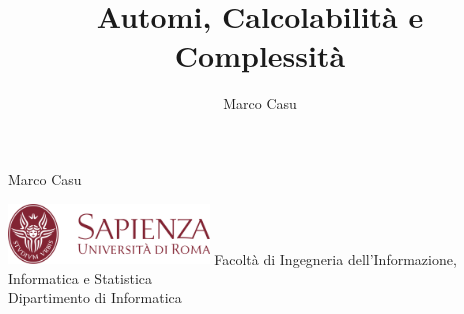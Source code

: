 \documentclass[10pt, letterpaper]{report}
\title{Automi, Calcolabilità e Complessità} %
\author{Marco Casu}
\date{\vspace{-5ex}}
\begin{document}
\usetikzlibrary{automata, arrows.meta, positioning}
\begin{titlepage}
    
\begin{center}
   \HUGE Marco Casu\acc
    \Huge \decothreeleft\hphantom{ }{\selectfont Automi, Calcolabilità e Complessità}\hphantom{ }\decothreeright
\end{center}
\thispagestyle{empty}
\begin{figure}[h]
\end{figure}
\vfill 
\centering \includegraphics[width=0.4\textwidth ]{../../preamble/Stemma_sapienza.png} \acc
\centering \Large \color{sapienza}Facoltà di Ingegneria dell'Informazione,
Informatica e Statistica\\
Dipartimento di Informatica
\end{titlepage}
\end{document}
